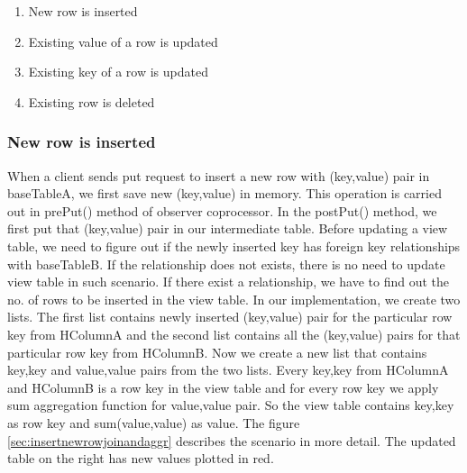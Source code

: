 \documentclass[11pt,a4paper,bibtotoc,idxtotoc,headsepline,footsepline,footexclude,BCOR12mm,DIV13]{scrbook}
\begin{document}

\begin{enumerate}
	\item New row is inserted
	\item Existing value of a row is updated
	\item Existing key of a row is updated
	\item Existing row is deleted
\end{enumerate}

\subsubsection{New row is inserted}
\label{sssec:newRowInsert}

When a client sends put request to insert a new row with (key,value) pair in baseTableA, we first save new (key,value) in memory. This operation is carried out in prePut() method of observer coprocessor. In the postPut() method, we first put that (key,value) pair in our intermediate table. Before updating a view table, we need to figure out if the newly inserted key has foreign key relationships with baseTableB. If the relationship does not exists, there is no need to update view table in such scenario. If there exist a relationship, we have to find out the no. of rows to be inserted in the view table. In our implementation, we create two lists. The first list contains newly inserted (key,value) pair for the particular row key from HColumnA and the second list contains all the (key,value) pairs for that particular row key from HColumnB. Now we create a new list that contains key,key and value,value pairs from the two lists. Every key,key from HColumnA and HColumnB is a row key in the view table and for every row key we apply sum aggregation function for value,value pair. So the view table contains key,key as row key and sum(value,value) as value. The figure \ref{sec:insertnewrowjoinandaggr} describes the scenario in more detail. The updated table on the right has new values plotted in red. 

\end{document}

